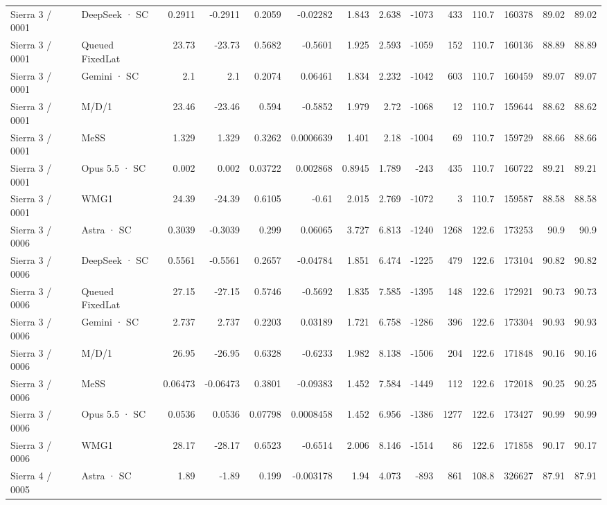 \begin{tabular}{llrrrrrrrrrrrr}
Sierra 3 / 0001 & DeepSeek · SC & 0.2911 & -0.2911 & 0.2059 & -0.02282 & 1.843 & 2.638 & -1073 & 433 & 110.7 & 160378 & 89.02 & 89.02 \\
Sierra 3 / 0001 & Queued FixedLat & 23.73 & -23.73 & 0.5682 & -0.5601 & 1.925 & 2.593 & -1059 & 152 & 110.7 & 160136 & 88.89 & 88.89 \\
Sierra 3 / 0001 & Gemini · SC & 2.1 & 2.1 & 0.2074 & 0.06461 & 1.834 & 2.232 & -1042 & 603 & 110.7 & 160459 & 89.07 & 89.07 \\
Sierra 3 / 0001 & M/D/1 & 23.46 & -23.46 & 0.594 & -0.5852 & 1.979 & 2.72 & -1068 & 12 & 110.7 & 159644 & 88.62 & 88.62 \\
Sierra 3 / 0001 & MeSS & 1.329 & 1.329 & 0.3262 & 0.0006639 & 1.401 & 2.18 & -1004 & 69 & 110.7 & 159729 & 88.66 & 88.66 \\
Sierra 3 / 0001 & Opus 5.5 · SC & 0.002 & 0.002 & 0.03722 & 0.002868 & 0.8945 & 1.789 & -243 & 435 & 110.7 & 160722 & 89.21 & 89.21 \\
Sierra 3 / 0001 & WMG1 & 24.39 & -24.39 & 0.6105 & -0.61 & 2.015 & 2.769 & -1072 & 3 & 110.7 & 159587 & 88.58 & 88.58 \\
Sierra 3 / 0006 & Astra · SC & 0.3039 & -0.3039 & 0.299 & 0.06065 & 3.727 & 6.813 & -1240 & 1268 & 122.6 & 173253 & 90.9 & 90.9 \\
Sierra 3 / 0006 & DeepSeek · SC & 0.5561 & -0.5561 & 0.2657 & -0.04784 & 1.851 & 6.474 & -1225 & 479 & 122.6 & 173104 & 90.82 & 90.82 \\
Sierra 3 / 0006 & Queued FixedLat & 27.15 & -27.15 & 0.5746 & -0.5692 & 1.835 & 7.585 & -1395 & 148 & 122.6 & 172921 & 90.73 & 90.73 \\
Sierra 3 / 0006 & Gemini · SC & 2.737 & 2.737 & 0.2203 & 0.03189 & 1.721 & 6.758 & -1286 & 396 & 122.6 & 173304 & 90.93 & 90.93 \\
Sierra 3 / 0006 & M/D/1 & 26.95 & -26.95 & 0.6328 & -0.6233 & 1.982 & 8.138 & -1506 & 204 & 122.6 & 171848 & 90.16 & 90.16 \\
Sierra 3 / 0006 & MeSS & 0.06473 & -0.06473 & 0.3801 & -0.09383 & 1.452 & 7.584 & -1449 & 112 & 122.6 & 172018 & 90.25 & 90.25 \\
Sierra 3 / 0006 & Opus 5.5 · SC & 0.0536 & 0.0536 & 0.07798 & 0.0008458 & 1.452 & 6.956 & -1386 & 1277 & 122.6 & 173427 & 90.99 & 90.99 \\
Sierra 3 / 0006 & WMG1 & 28.17 & -28.17 & 0.6523 & -0.6514 & 2.006 & 8.146 & -1514 & 86 & 122.6 & 171858 & 90.17 & 90.17 \\
Sierra 4 / 0005 & Astra · SC & 1.89 & -1.89 & 0.199 & -0.003178 & 1.94 & 4.073 & -893 & 861 & 108.8 & 326627 & 87.91 & 87.91 \\

\end{tabular}
